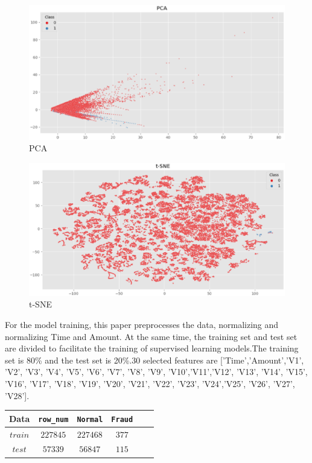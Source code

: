 \begin{figure}[H]
	\centering
	\includegraphics[scale=0.4]{pca.eps}
	\caption{PCA}\label{fig:OutAspect-target}
\end{figure}
\begin{figure}[H]
	\centering
	\includegraphics[scale=0.4]{tsne.eps}
	\caption{t-SNE}\label{fig:OutAspect-target}
	\end{figure}
For the model training, this paper preprocesses the data, normalizing and normalizing Time and Amount. At the same time, the training set and test set are divided to facilitate the training of supervised learning models.The training set is 80\% and the test set is 20\%.30 selected features are  [’Time’,’Amount’,’V1’, ’V2’, ’V3’, ’V4’, ’V5’, ’V6’, ’V7’, ’V8’, ’V9’, ’V10’,’V11’,’V12’, ’V13’, ’V14’, ’V15’, ’V16’, ’V17’, ’V18’, ’V19’, ’V20’, ’V21’, ’V22’, ’V23’, ’V24’,’V25’, ’V26’, ’V27’, ’V28’].
\begin{center}
	\begin{tabular}{c| c c c c c }
		\toprule
		Data & \texttt{row_num}  & \texttt{Normal} & \texttt{Fraud} \\
		\midrule
		$train$
		&  {$227845$} &  {$227468$} &  {$377$} \\
		$test$
		&  {$57339$} &  {$56847$} &  {$115$} \\
		\bottomrule
	\end{tabular}
\end{center}

